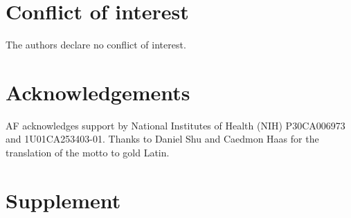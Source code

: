 \documentclass{llncs}
\begin{document}
\section{Conflict of interest}
The authors declare no conflict of interest.

\section{Acknowledgements}
AF acknowledges support by National Institutes of Health (NIH) P30CA006973 and 1U01CA253403-01.
Thanks to Daniel Shu and Caedmon Haas for the translation of the motto to gold Latin. 





\newcommand{\beginsupplement}{%
 \setcounter{table}{0}
 \renewcommand{\thetable}{S\arabic{table}}%
 \setcounter{figure}{0}
 \renewcommand{\thefigure}{S\arabic{figure}}
 \setcounter{equation}{0}
 \renewcommand{\theequation}{S\arabic{equation}}%
 }

\newpage
\section*{Supplement}
\beginsupplement
\end{document}

